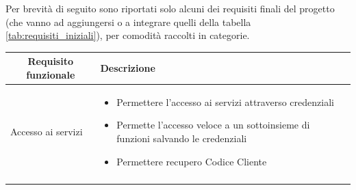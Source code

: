 Per brevità di seguito sono riportati solo alcuni dei requisiti finali del progetto (che vanno ad aggiungersi o a integrare quelli della tabella \ref{tab:requisiti_iniziali}), per comodità raccolti in categorie.
\begin{center}

    \begin{longtable}{p{6cm}|p{8cm}}

    \toprule
    \multicolumn{1}{c}{\textbf{Requisito funzionale}} &
    \textbf{Descrizione}\\

    \midrule
    Accesso ai servizi & \begin{itemize}
                          \item Permettere l'accesso ai servizi attraverso credenziali
                          \item Permette l'accesso veloce a un sottoinsieme di funzioni salvando le credenziali
                          \item Permettere recupero Codice Cliente
                         \end{itemize}\\\\


\end{longtable}
\end{center}
